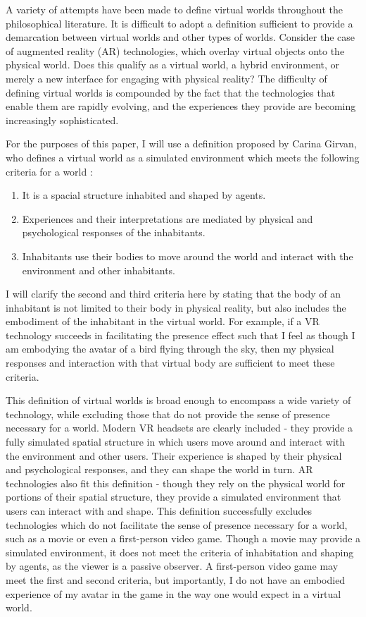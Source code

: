 A variety of attempts have been made to define virtual worlds throughout the
philosophical literature. It is difficult to adopt a definition sufficient to 
provide a demarcation between virtual worlds and other types of worlds.
Consider the case of augmented reality (AR) technologies, which overlay virtual
objects onto the physical world. Does this qualify as a virtual world, a hybrid
environment, or merely a new interface for engaging with physical reality? The
difficulty of defining virtual worlds is compounded by the fact that the
technologies that enable them are rapidly evolving, and the experiences they
provide are becoming increasingly sophisticated.

For the purposes of this paper, I will use a definition proposed by Carina
Girvan, who defines a virtual world as a simulated environment which meets the
following criteria for a world \citep{Girvan2018}:
\begin{enumerate}
    \item It is a spacial structure inhabited and shaped by agents.
    \item Experiences and their interpretations are mediated by physical and
          psychological responses of the inhabitants.
    \item Inhabitants use their bodies to move around the world and interact
          with the environment and other inhabitants.
\end{enumerate}
I will clarify the second and third criteria here by stating that the body of 
an inhabitant is not limited to their body in physical reality, but also includes
the embodiment of the inhabitant in the virtual world. For example, if a VR 
technology succeeds in facilitating the presence effect such that I feel as
though I am embodying the avatar of a bird flying through the sky, then my 
physical responses and interaction with that virtual body are sufficient to 
meet these criteria.

This definition of virtual worlds is broad enough to encompass a wide variety
of technology, while excluding those that do not provide the sense of presence
necessary for a world. Modern VR headsets are clearly included - they provide a
fully simulated spatial structure in which users move around and interact with
the environment and other users. Their experience is shaped by their physical
and psychological responses, and they can shape the world in turn. AR
technologies also fit this definition - though they rely on the physical world 
for portions of their spatial structure, they provide a simulated environment
that users can interact with and shape. This definition successfully excludes
technologies which do not facilitate the sense of presence necessary for a
world, such as a movie or even a first-person video game. Though a movie may
provide a simulated environment, it does not meet the criteria of inhabitation
and shaping by agents, as the viewer is a passive observer. A first-person video
game may meet the first and second criteria, but importantly, I do not have an
embodied experience of my avatar in the game in the way one would expect in a 
virtual world.

